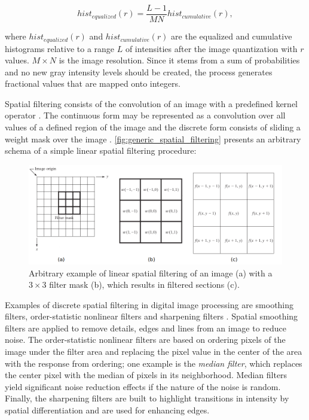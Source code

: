 \begin{equation}
\label{eqn:histogram_equalization}
hist_{equalized}(r) = \frac{L - 1}{MN} hist_{cumulative}(r),
\end{equation}

\noindent where $hist_{equalized}(r)$ and $hist_{cumulative}(r)$ are the equalized and cumulative histograms relative to a range $L$ of intensities after the image quantization with $r$ values. $M \times N$ is the image resolution. Since it stems from a sum of probabilities and no new gray intensity levels should be created, the process generates fractional values that are mapped onto integers.

Spatial filtering consists of the convolution of an image with a predefined kernel operator \cite{gonzalez2018digital}. The continuous form may be represented as a convolution over all values of a defined region of the image and the discrete form consists of sliding a weight mask over the image \cite{wu2008microscope}. \autoref{fig:generic_spatial_filtering} presents an arbitrary schema of a simple linear spatial filtering procedure:

\begin{figure}[htb]
	\centering
	\caption{\label{fig:generic_spatial_filtering} Arbitrary example of linear spatial filtering of an image (a) with a $3 \times 3$ filter mask (b), which results in filtered sections (c).} 
	\begin{center}
	    \includegraphics[scale=0.4]{images/generic_spatial_filtering.png}
	\end{center}
	\centering
\end{figure}

Examples of discrete spatial filtering in digital image processing are smoothing filters, order-statistic nonlinear filters and sharpening filters \cite{gonzalez2018digital}. Spatial smoothing filters are applied to remove details, edges and lines from an image to reduce noise. The order-statistic nonlinear filters are based on ordering pixels of the image under the filter area and replacing the pixel value in the center of the area with the response from ordering; one example is the \emph{median filter}, which replaces the center pixel with the median of pixels in its neighborhood. Median filters yield significant noise reduction effects if the nature of the noise is random. Finally, the sharpening filters are built to highlight transitions in intensity by spatial differentiation and are used for enhancing edges.


